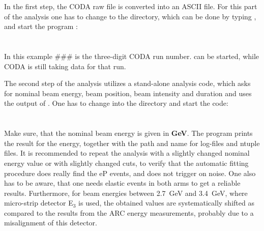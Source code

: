 {{In the first step, the CODA raw file is converted into an
ASCII file.
For this part of the analysis one has to change to the 
directory, which can be done by typing , and start
the program :\\
\\
\\
In this example \#\#\# is the three-digit CODA run number.  can be started,
while CODA is still taking data for that run.

The second step of the analysis utilizes a stand-alone analysis code,
which asks for nominal beam energy, beam position, beam intensity
and duration and uses the output of . One has to
change into the  directory and start the code:\\
\\
\\
Make sure, that the nominal beam energy is given in \textbf{GeV}.
The program prints the result for the energy, together with
the path and name for log-files and ntuple files.
It is recommended to repeat the analysis with a slightly changed
nominal energy value or with slightly changed cuts, to verify that
the automatic fitting procedure does really find the eP events,
and does not trigger on noise. One also has to be aware, that one
needs elastic events in both arms to get a reliable results.
Furthermore, for beam energies between 2.7~GeV and 3.4~GeV,
where micro-strip detector E$_3$ is used, the obtained
values are systematically shifted as compared to the results from the ARC energy measurements, 
probably due to a misalignment of this detector.
}}

